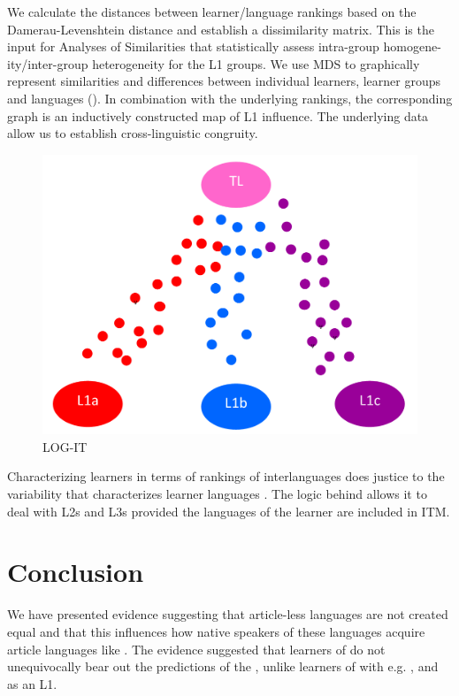 \documentclass[output=paper,
modfonts
]{langscibook}
\begin{document}
We calculate the distances between learner/language rankings based on the Damerau-Levenshtein distance and establish a dissimilarity matrix. This is the input for Analyses of Similarities that statistically assess intra-group homogene\hyp{}ity/inter-group heterogeneity for the L1 groups. We use MDS to graphically represent similarities and differences between individual learners, learner groups and languages (). In combination with the underlying rankings, the corresponding graph is an inductively constructed map of L1 influence. The underlying data allow us to establish cross-linguistic congruity. 

\begin{figure}
\includegraphics[height=.3\textheight]{figures/LOG-IT.png}
\caption{LOG-IT}
\label{fig:lebruyn:5}
\end{figure}

Characterizing learners in terms of rankings of interlanguages does justice to the variability that characterizes learner languages \citep{LarsenFreeman2006,deBotetal2007}. The logic behind  allows it to deal with L2s and L3s provided the languages of the learner are included in ITM.

\section{Conclusion}
\label{lebruyn:6:conclusion}

We have presented evidence suggesting that article-less languages are not created equal and that this influences how native speakers of these languages acquire article languages like . The evidence suggested that  learners of  do not unequivocally bear out the predictions of the , unlike learners of  with e.g. ,  and  as an L1. 
\end{document}
